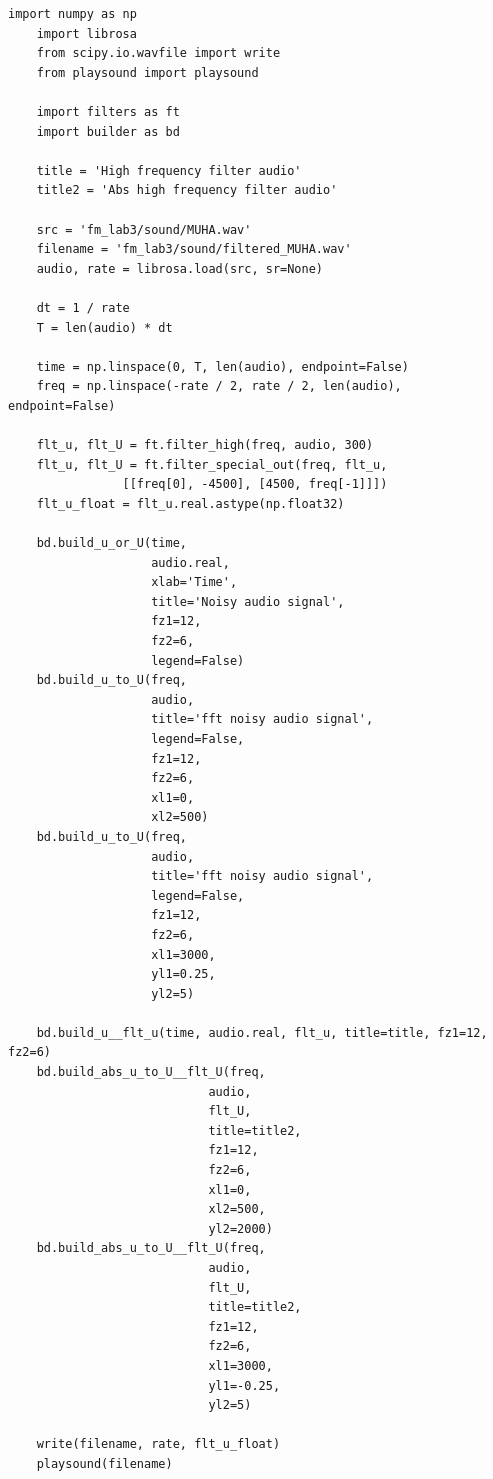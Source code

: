 \documentclass[a4paper, 12pt]{article}
\begin{document}
    \begin{lstlisting}[label=l8, caption={Файл audio.py. Фильтрация шумов в аудиозаписи}]
    import numpy as np
    import librosa
    from scipy.io.wavfile import write
    from playsound import playsound

    import filters as ft
    import builder as bd

    title = 'High frequency filter audio'
    title2 = 'Abs high frequency filter audio'

    src = 'fm_lab3/sound/MUHA.wav'
    filename = 'fm_lab3/sound/filtered_MUHA.wav'
    audio, rate = librosa.load(src, sr=None)

    dt = 1 / rate
    T = len(audio) * dt

    time = np.linspace(0, T, len(audio), endpoint=False)
    freq = np.linspace(-rate / 2, rate / 2, len(audio), endpoint=False)

    flt_u, flt_U = ft.filter_high(freq, audio, 300)
    flt_u, flt_U = ft.filter_special_out(freq, flt_u,
                [[freq[0], -4500], [4500, freq[-1]]])
    flt_u_float = flt_u.real.astype(np.float32)

    bd.build_u_or_U(time,
                    audio.real,
                    xlab='Time',
                    title='Noisy audio signal',
                    fz1=12,
                    fz2=6,
                    legend=False)
    bd.build_u_to_U(freq,
                    audio,
                    title='fft noisy audio signal',
                    legend=False,
                    fz1=12,
                    fz2=6,
                    xl1=0,
                    xl2=500)
    bd.build_u_to_U(freq,
                    audio,
                    title='fft noisy audio signal',
                    legend=False,
                    fz1=12,
                    fz2=6,
                    xl1=3000,
                    yl1=0.25,
                    yl2=5)

    bd.build_u__flt_u(time, audio.real, flt_u, title=title, fz1=12, fz2=6)
    bd.build_abs_u_to_U__flt_U(freq,
                            audio,
                            flt_U,
                            title=title2,
                            fz1=12,
                            fz2=6,
                            xl1=0,
                            xl2=500,
                            yl2=2000)
    bd.build_abs_u_to_U__flt_U(freq,
                            audio,
                            flt_U,
                            title=title2,
                            fz1=12,
                            fz2=6,
                            xl1=3000,
                            yl1=-0.25,
                            yl2=5)

    write(filename, rate, flt_u_float)
    playsound(filename)
    \end{lstlisting}
\end{document}
